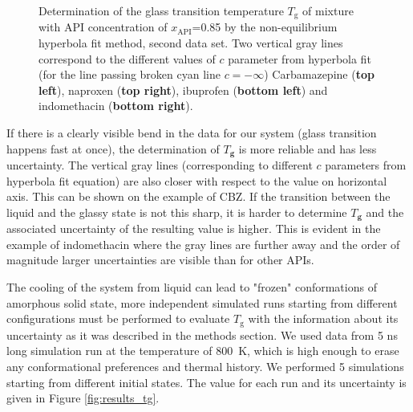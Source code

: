 \begin{figure}[H]
	\vspace{-0.2cm}
	\caption{Determination of the glass transition temperature $T_\text{g}$ of mixture with API concentration of $x_\text{API}$=0.85 by the non-equilibrium hyperbola fit method, second data set. Two vertical gray lines correspond to the different values of $c$ parameter from hyperbola fit (for the line passing broken cyan line $c=-\infty$) Carbamazepine (\textbf{top left}), naproxen (\textbf{top right}), ibuprofen (\textbf{bottom left}) and indomethacin (\textbf{bottom right}).}
	\label{fig:tg_evaluation}    
\end{figure}


If there is a clearly visible bend in the data for our system (glass transition happens fast at once), the determination of $T_\textbf{g}$ is more reliable and has less uncertainty. The vertical gray lines (corresponding to different $c$ parameters from hyperbola fit equation) are also closer with respect to the value on horizontal axis. This can be shown on the example of CBZ. If the transition between the liquid and the glassy state is not this sharp, it is harder to determine $T_\textbf{g}$ and the associated uncertainty of the resulting value is higher. This is evident in the example of indomethacin where the gray lines are further away and the order of magnitude larger uncertainties are visible than for other APIs.

The cooling of the system from liquid can lead to "frozen" conformations of amorphous solid state, more independent simulated runs starting from different configurations must be performed to evaluate $T_\text{g}$ with the information about its uncertainty as it was described in the methods section. We used data from 5 ns long simulation run at the temperature of 800~K, which is high enough to erase any conformational preferences and thermal history. We performed 5 simulations starting from different initial states. The value for each run and its uncertainty is given in Figure \ref{fig:results_tg}. 

